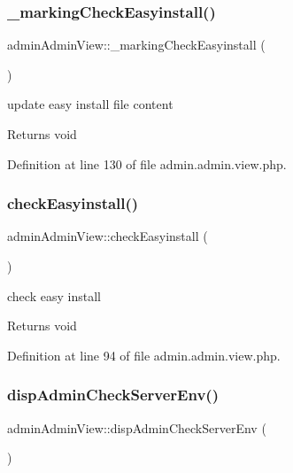 \subsubsection{\texorpdfstring{\+\_\+marking\+Check\+Easyinstall()}{\_markingCheckEasyinstall()}}
{\footnotesize\ttfamily admin\+Admin\+View\+::\+\_\+marking\+Check\+Easyinstall (\begin{DoxyParamCaption}{ }\end{DoxyParamCaption})}

update easy install file content \begin{DoxyReturn}{Returns}
void 
\end{DoxyReturn}


Definition at line 130 of file admin.\+admin.\+view.\+php.

\hypertarget{classadminAdminView_ae7b11554f7c30beb8554d15b33852dd7}{}\label{classadminAdminView_ae7b11554f7c30beb8554d15b33852dd7} 
\subsubsection{\texorpdfstring{check\+Easyinstall()}{checkEasyinstall()}}
{\footnotesize\ttfamily admin\+Admin\+View\+::check\+Easyinstall (\begin{DoxyParamCaption}{ }\end{DoxyParamCaption})}

check easy install \begin{DoxyReturn}{Returns}
void 
\end{DoxyReturn}


Definition at line 94 of file admin.\+admin.\+view.\+php.

\hypertarget{classadminAdminView_a4041d717f643f568e4aad570e8a60e47}{}\label{classadminAdminView_a4041d717f643f568e4aad570e8a60e47} 
\subsubsection{\texorpdfstring{disp\+Admin\+Check\+Server\+Env()}{dispAdminCheckServerEnv()}}
{\footnotesize\ttfamily admin\+Admin\+View\+::disp\+Admin\+Check\+Server\+Env (\begin{DoxyParamCaption}{ }\end{DoxyParamCaption})}



